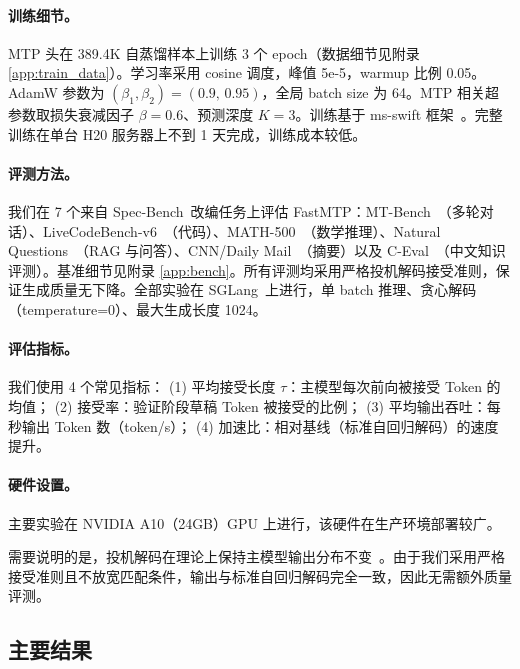 \documentclass{article} %
\begin{document}
\paragraph{训练细节。}
MTP 头在 389.4K 自蒸馏样本上训练 3 个 epoch（数据细节见附录 \ref{app:train_data}）。学习率采用 cosine 调度，峰值 5e-5，warmup 比例 0.05。AdamW 参数为 $(\beta_1, \beta_2) = (0.9,\, 0.95)$，全局 batch size 为 64。MTP 相关超参数取损失衰减因子 $\beta = 0.6$、预测深度 $K = 3$。训练基于 ms-swift 框架~\citep{zhao2025swift}。完整训练在单台 H20 服务器上不到 1 天完成，训练成本较低。

\paragraph{评测方法。}
我们在 7 个来自 Spec-Bench~\citep{xia2024unlocking}改编任务上评估 FastMTP：MT-Bench~\citep{zheng2023judging}（多轮对话）、LiveCodeBench-v6~\citep{jain2024livecodebench}（代码）、MATH-500~\citep{lightman2023lets}（数学推理）、Natural Questions~\citep{kwiatkowski2019natural}（RAG 与问答）、CNN/Daily Mail~\citep{nallapati2016abstractive}（摘要）以及 C-Eval~\citep{huang2023ceval}（中文知识评测）。基准细节见附录 \ref{app:bench}。所有评测均采用严格投机解码接受准则，保证生成质量无下降。全部实验在 SGLang~\citep{zheng2024sglang}上进行，单 batch 推理、贪心解码（temperature=0）、最大生成长度 1024。

\paragraph{评估指标。} 我们使用 4 个常见指标：
(1) 平均接受长度 $\tau$：主模型每次前向被接受 Token 的均值；
(2) 接受率：验证阶段草稿 Token 被接受的比例；
(3) 平均输出吞吐：每秒输出 Token 数（token/s）；
(4) 加速比：相对基线（标准自回归解码）的速度提升。

\paragraph{硬件设置。}
主要实验在 NVIDIA A10（24GB）GPU 上进行，该硬件在生产环境部署较广。


需要说明的是，投机解码在理论上保持主模型输出分布不变~\citep{leviathan2023fast,chen2023accelerating}。由于我们采用严格接受准则且不放宽匹配条件，输出与标准自回归解码完全一致，因此无需额外质量评测。

\subsection{主要结果}
\end{document}

